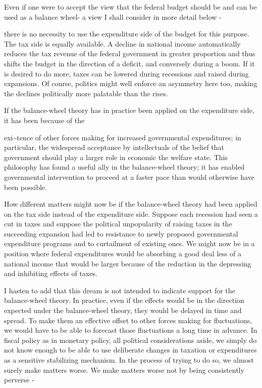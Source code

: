 \documentclass[11pt,openany]{book}
\begin{document}
Even if one were to accept the view that the federal budget should be and can be used as a balance wheel- a view I shall consider in more detail below -

there is no necessity to use the expenditure side of the budget for this purpose. The tax side is equally available. A decline in national income automatically reduces the tax revenue of the federal government in greater proportion and thus shifts the budget in the direction of a deficit, and conversely during a boom. If it is desired to do more, taxes can be lowered during recessions and raised during expansions. Of course, politics might well enforce an asymmetry here too, making the declines politically more palatable than the rises.

If the balance-wheel theory has in practice been applied on the expenditure side, it has been because of the

exi\textasciitilde{}tence of other forces making for increased governmental expenditures; in particular, the widespread acceptance by intellectuals of the belief that government should play a larger role in economic the welfare state. This philosophy has found a useful ally in the balance-wheel theory; it has enabled governmental intervention to proceed at a faster pace than would otherwise have been possible.

How different matters might now be if the balance-wheel theory had been applied on the tax side instead of the expenditure side. Suppose each recession had seen a cut in taxes and suppose the political unpopularity of raising taxes in the succeeding expansion had led to resistance to newly proposed governmental expenditure programs and to curtailment of existing ones. We might now be in a position where federal expenditures would be absorbing a good deal less of a national income that would be larger because of the reduction in the depressing and inhibiting effects of taxes.

I hasten to add that this dream is not intended to indicate support for the balance-wheel theory. In practice, even if the effects would be in the direction expected under the balance-wheel theory, they would be delayed in time and spread. To make them an effective offset to other forces making for fluctuations, we would have to be able to forecast those fluctuations a long time in advance. In fiscal policy as in monetary policy, all political considerations aside, we simply do not know enough to be able to use deliberate changes in taxation or expenditures as a sensitive stabilizing mechanism. In the process of trying to do so, we almost surely make matters worse. We make matters worse not by being consistently perverse -
\end{document}
